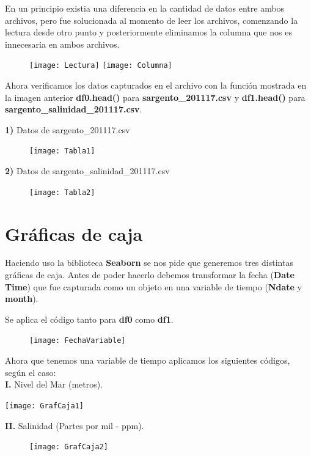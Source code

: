 En un principio existia una diferencia en la cantidad de datos entre ambos archivos, pero fue solucionada al momento de leer los archivos, comenzando la lectura desde otro punto y posteriormente eliminamos la columna que nos es innecesaria en ambos archivos.

\begin{figure}[h!]
\centering
\texttt{[image: Lectura]}
\texttt{[image: Columna]}
\end{figure}

Ahora verificamos los datos capturados en el archivo con la función mostrada en la imagen anterior \textbf{df0.head()} para \textbf{sargento\_201117.csv} y \textbf{df1.head()} para \textbf{sargento\_salinidad\_201117.csv}.

\textbf{1)} Datos de sargento\_201117.csv
\begin{figure}[h!]
\centering
\texttt{[image: Tabla1]}
\end{figure}

\textbf{2)} Datos de sargento\_salinidad\_201117.csv
\begin{figure}[h!]
\centering
\texttt{[image: Tabla2]}
\end{figure}


\section{Gráficas de caja}
Haciendo uso la biblioteca \textbf{Seaborn} se nos pide que generemos tres distintas gráficas de caja. Antes de poder hacerlo debemos transformar la fecha (\textbf{Date Time}) que fue capturada como un objeto en una variable de tiempo (\textbf{Ndate} y \textbf{month}).

Se aplica el código tanto para \textbf{df0} como \textbf{df1}.

\begin{figure}[h!]
\centering
\texttt{[image: FechaVariable]}
\end{figure}

Ahora que tenemos una variable de tiempo aplicamos los siguientes códigos, según el caso:
\\ \textbf{I.} Nivel del Mar (metros).
\begin{center}
\texttt{[image: GrafCaja1]}
\end{center}


\noindent \textbf{II.} Salinidad (Partes por mil - ppm).\\
\begin{figure}[h!]
\centering
\texttt{[image: GrafCaja2]}
\end{figure}

